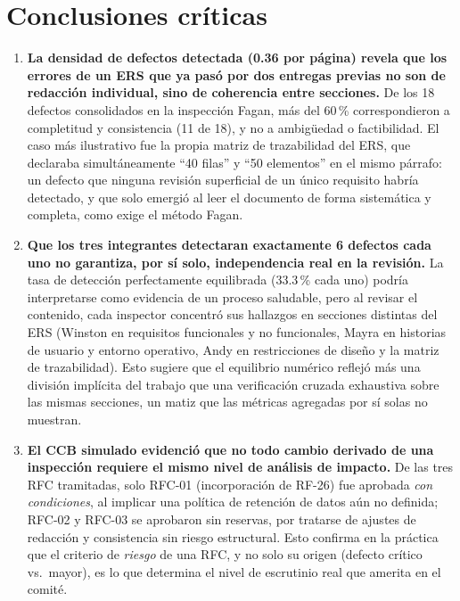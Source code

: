 \documentclass[journal,onecolumn]{IEEEtran}
\begin{document}
	\section{Conclusiones críticas}
	
	\begin{enumerate}[label=\textbf{\arabic*.}, leftmargin=*]
		
		\item \textbf{La densidad de defectos detectada (0.36 por página) revela que los errores de un ERS que ya pasó por dos entregas previas no son de redacción individual, sino de coherencia entre secciones.} De los 18 defectos consolidados en la inspección Fagan, más del 60\,\% correspondieron a completitud y consistencia (11 de 18), y no a ambigüedad o factibilidad. El caso más ilustrativo fue la propia matriz de trazabilidad del ERS, que declaraba simultáneamente ``40 filas'' y ``50 elementos'' en el mismo párrafo: un defecto que ninguna revisión superficial de un único requisito habría detectado, y que solo emergió al leer el documento de forma sistemática y completa, como exige el método Fagan.
		
		\item \textbf{Que los tres integrantes detectaran exactamente 6 defectos cada uno no garantiza, por sí solo, independencia real en la revisión.} La tasa de detección perfectamente equilibrada (33.3\,\% cada uno) podría interpretarse como evidencia de un proceso saludable, pero al revisar el contenido, cada inspector concentró sus hallazgos en secciones distintas del ERS (Winston en requisitos funcionales y no funcionales, Mayra en historias de usuario y entorno operativo, Andy en restricciones de diseño y la matriz de trazabilidad). Esto sugiere que el equilibrio numérico reflejó más una división implícita del trabajo que una verificación cruzada exhaustiva sobre las mismas secciones, un matiz que las métricas agregadas por sí solas no muestran.
		
		\item \textbf{El CCB simulado evidenció que no todo cambio derivado de una inspección requiere el mismo nivel de análisis de impacto.} De las tres RFC tramitadas, solo RFC-01 (incorporación de RF-26) fue aprobada \textit{con condiciones}, al implicar una política de retención de datos aún no definida; RFC-02 y RFC-03 se aprobaron sin reservas, por tratarse de ajustes de redacción y consistencia sin riesgo estructural. Esto confirma en la práctica que el criterio de \textit{riesgo} de una RFC, y no solo su origen (defecto crítico vs.\ mayor), es lo que determina el nivel de escrutinio real que amerita en el comité.
		

\end{enumerate}
\end{document}

